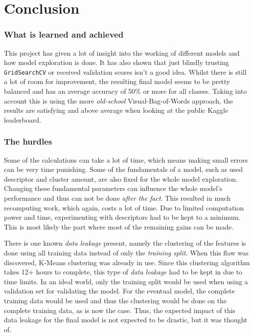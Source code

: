 \part{Conclusion}
\label{part:conclusion}


\section{What is learned and achieved}
\label{section:con_achieved}

This project has given a lot of insight into the working of different models and how model exploration is done.
It has also shown that just blindly trusting \texttt{GridSearchCV} or received validation scores isn't a good idea.
Whilst there is still a lot of room for improvement, the resulting final model seems to be pretty balanced and has an average accuracy of 50\% or more for all classes.
Taking into account this is using the more \textit{old-school} Visual-Bag-of-Words approach, the results are satisfying and above average when looking at the public Kaggle leaderboard.


\section{The hurdles}
\label{section:con_hurdles}

Some of the calculations can take a lot of time, which means making small errors can be very time punishing.
Some of the fundamentals of a model, such as used descriptor and cluster amount, are also fixed for the whole model exploration.
Changing these fundamental parameters can influence the whole model's performance and thus can not be done \textit{after the fact}.
This resulted in much recomputing work, which again, costs a lot of time.
Due to limited computation power and time, experimenting with descriptors had to be kept to a minimum. 
This is most likely the part where most of the remaining gains can be made.

There is one known \textit{data leakage} present, namely the clustering of the features is done using all training data instead of only the \textit{training split}.
When this flaw was discovered, K-Means clustering was already in use.
Since this clustering algorithm takes 12+ hours to complete, this type of \textit{data leakage} had to be kept in due to time limits.
In an ideal world, only the training split would be used when using a validation set for validating the model.
For the eventual model, the complete training data would be used and thus the clustering would be done on the complete training data, as is now the case.
Thus, the expected impact of this data leakage for the final model is not expected to be drastic, but it was thought of. 

